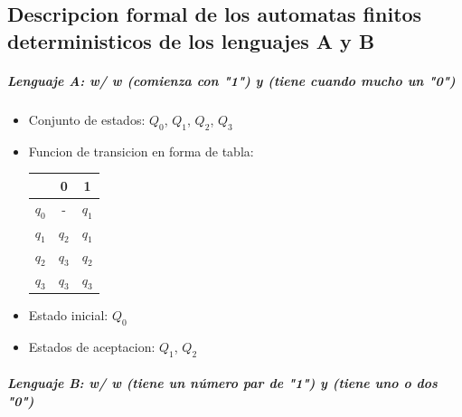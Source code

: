 \documentclass[a4paper, 12pt]{article}
\begin{document}
\subsection{Descripcion formal de los automatas finitos deterministicos de los lenguajes A y B}


\subparagraph{Lenguaje A: {w/ w (comienza con "1") y (tiene cuando mucho un "0")}}

\begin{itemize}
    \item Conjunto de estados: \( Q_0 \),  \( Q_1 \), \( Q_2 \), \( Q_3 \)
    \item Funcion de transicion en forma de tabla:
    \newline

    \hspace{5cm}
    \begin{tabular}{|c|c|c|}
    \hline
     & 0 & 1 \\
    \hline
    \( q_0 \) & - & \( q_1 \) \\
    
    \( q_1 \) & \( q_2 \) & \( q_1 \) \\

    \( q_2 \) & \( q_3 \) & \( q_2 \) \\

    \( q_3 \) & \( q_3 \) & \( q_3 \) \\

    \hline
    \end{tabular}

    \item Estado inicial: \( Q_0 \)
    \item Estados de aceptacion: \( Q_1 \), \( Q_2 \)
    
\end{itemize}


\subparagraph{Lenguaje B: {w/ w (tiene un número par de "1") y (tiene uno o dos "0")} }
\end{document}
